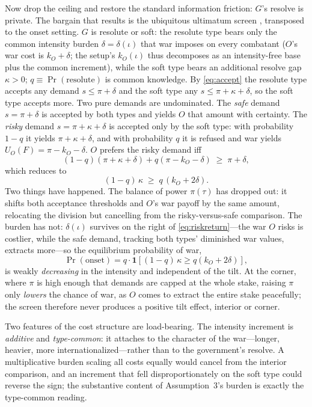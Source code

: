 Now drop the ceiling and restore the standard information friction: $G$'s
resolve is private.  The bargain that results is the ubiquitous ultimatum
screen \citep[e.g.,][]{slantchevtarar2011}, transposed to the onset setting.  $G$ is resolute or soft: the resolute type bears only
the common intensity burden $\delta = \delta(\iota)$ that war imposes on
every combatant ($O$'s war cost is $k_O + \delta$; the setup's $k_O(\iota)$
thus decomposes as an intensity-free base plus the common increment), while
the soft type bears an additional resolve gap $\kappa > 0$; $q \equiv
\Pr(\text{resolute})$ is common knowledge.  By \eqref{eq:accept} the resolute
type accepts any demand $s \le \pi + \delta$ and the soft type any $s \le \pi
+ \kappa + \delta$, so the soft type accepts more.  Two pure demands are
undominated.  The \emph{safe} demand $s = \pi + \delta$ is accepted by both
types and yields $O$ that amount with certainty.  The \emph{risky} demand
$s = \pi + \kappa + \delta$ is accepted only by the soft type: with
probability $1 - q$ it yields $\pi + \kappa + \delta$, and with probability
$q$ it is refused and war yields $U_O(F) = \pi - k_O - \delta$.  $O$ prefers
the risky demand iff
\[
  (1 - q)(\pi + \kappa + \delta) + q(\pi - k_O - \delta) \;\ge\; \pi + \delta,
\]
which reduces to
\begin{equation}
  (1 - q)\,\kappa \;\ge\; q\,(k_O + 2\delta). \label{eq:riskreturn}
\end{equation}
Two things have happened.  The balance of power $\pi(\tau)$ has dropped out:
it shifts both acceptance thresholds and $O$'s war payoff by the same amount,
relocating the division but cancelling from the risky-versus-safe comparison.
The burden has not: $\delta(\iota)$ survives on the right of
\eqref{eq:riskreturn}---the war $O$ risks is costlier, while the safe demand,
tracking both types' diminished war values, extracts more---so the
equilibrium probability of war,
\[
  \Pr(\text{onset}) = q \cdot \mathbf{1}\!\left[(1 - q)\,\kappa \ge
  q(k_O + 2\delta)\right],
\]
is weakly \emph{decreasing} in the intensity and independent of the tilt.  At the
corner, where $\pi$ is high enough that demands are capped at the whole stake,
raising $\pi$ only \emph{lowers} the chance of war, as $O$ comes to extract
the entire stake peacefully; the screen therefore never produces a positive
tilt effect, interior or corner.

Two features of the cost structure are load-bearing.  The intensity increment is
\emph{additive} and \emph{type-common}: it attaches to the character of the
war---longer, heavier, more internationalized---rather than to the
government's resolve.  A multiplicative burden scaling all costs equally would
cancel from the interior comparison, and an increment that fell
disproportionately on the soft type could reverse the sign; the substantive
content of Assumption~3's burden is exactly the type-common reading.

